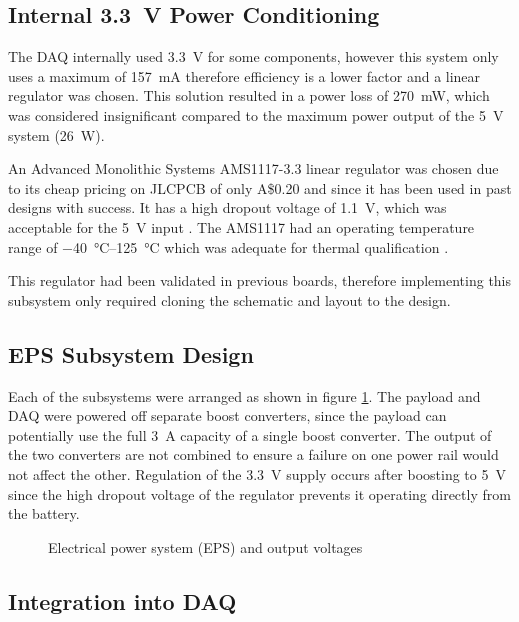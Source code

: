 \documentclass{report}
\newcommand{\aud}{A\$}
\begin{document}
\subsection{Internal \SI{3.3}{\volt} Power Conditioning}

The DAQ internally used \SI{3.3}{\volt} for some components, however this system only uses a maximum of \SI{157}{\milli\ampere} therefore efficiency is a lower factor and a linear regulator was chosen. This solution resulted in a power loss of \SI{270}{\milli\watt}, which was considered insignificant compared to the maximum power output of the \SI{5}{\volt} system (\SI{26}{\watt}).

An Advanced Monolithic Systems AMS1117-3.3 linear regulator was chosen due to its cheap pricing on JLCPCB of only \aud 0.20 and since it has been used in past designs with success. It has a high dropout voltage of \SI{1.1}{\volt}, which was acceptable for the \SI{5}{\volt} input \cite{ams2007ams1117}. The AMS1117 had an operating temperature range of \SIrange{-40}{125}{\degreeCelsius} which was adequate for thermal qualification \cite{ams2007ams1117}.

This regulator had been validated in previous boards, therefore implementing this subsystem only required cloning the schematic and layout to the design.

\subsection{EPS Subsystem Design}

Each of the subsystems were arranged as shown in figure \ref{fig:power-conditioning}. The payload and DAQ were powered off separate boost converters, since the payload can potentially use the full \SI{3}{\ampere} capacity of a single boost converter. The output of the two converters are not combined to ensure a failure on one power rail would not affect the other. Regulation of the \SI{3.3}{\volt} supply occurs after boosting to \SI{5}{\volt} since the high dropout voltage of the regulator prevents it operating directly from the battery.

\begin{figure}[H]
  \centering
  
  \caption{Electrical power system (EPS) and output voltages}
  \label{fig:power-conditioning}
\end{figure}

\subsection{Integration into DAQ}
\end{document}
